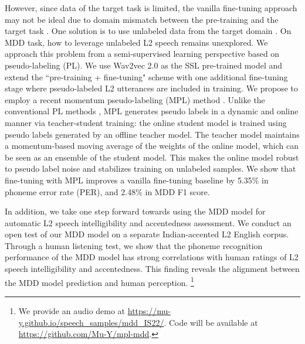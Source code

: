 \documentclass[a4paper]{article}
\begin{document}
However, since data of the target task is limited, the vanilla fine-tuning approach may not be ideal due to domain mismatch between the pre-training and the target task \cite{gururangan2020don, dery2021should}. One solution is to use unlabeled data from the target domain \cite{chen2021exploring, gururangan2020don}. On MDD task, how to leverage unlabeled L2 speech remains unexplored. We approach this problem from a semi-supervised learning perspective based on pseudo-labeling (PL). We use Wav2vec 2.0 \cite{baevski2020wav2vec} as the SSL pre-trained model and extend the ``pre-training + fine-tuning" scheme with one additional fine-tuning stage where pseudo-labeled L2 utterances are included in training. We propose to employ a recent momentum pseudo-labeling (MPL) method \cite{higuchi2021momentum}. Unlike the conventional PL methods \cite{kahn2020self, xu20b_interspeech, park20d_interspeech}, MPL generates pseudo labels in a dynamic and online manner via teacher-student training: the online student model is trained using pseudo labels generated by an offline teacher model. The teacher model maintains a momentum-based moving average of the weights of the online model, which can be seen as an ensemble of the student model. This makes the online model robust to pseudo label noise and stabilizes training on unlabeled samples. We show that fine-tuning with MPL improves a vanilla fine-tuning baseline by 5.35\% in phoneme error rate (PER), and 2.48\% in MDD F1 score.%

In addition, we take one step forward towards using the MDD model for automatic L2 speech intelligibility and accentedness assessment. We conduct an open test of our MDD model on a separate Indian-accented L2 English corpus. Through a human listening test, we show that the phoneme recognition performance of the MDD model has strong correlations with human ratings of L2 speech intelligibility and accentedness. This finding reveals the alignment between the MDD model prediction and human perception. \footnote{We provide an audio demo at \url{https://mu-y.github.io/speech_samples/mdd_IS22/}. Code will be available at \url{https://github.com/Mu-Y/mpl-mdd}.}


\end{document}
